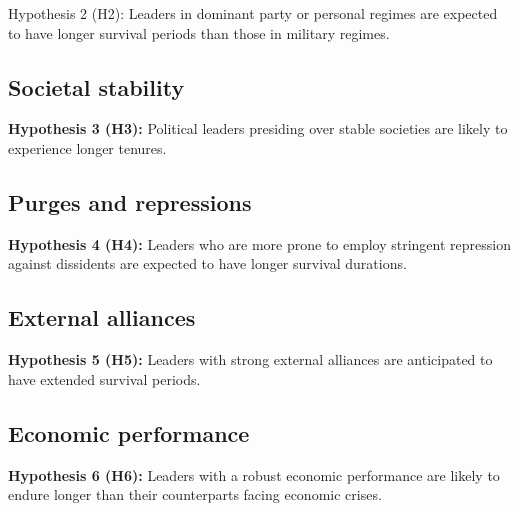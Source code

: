 \documentclass[
  a4paper,
  12pt]{article}
\begin{document}
Hypothesis 2 (H2): Leaders in dominant party or personal regimes are
expected to have longer survival periods than those in military regimes.

\subsection{Societal stability}\label{societal-stability}

\textbf{Hypothesis 3 (H3):} Political leaders presiding over stable
societies are likely to experience longer tenures.

\subsection{Purges and repressions}\label{purges-and-repressions}

\textbf{Hypothesis 4 (H4):} Leaders who are more prone to employ
stringent repression against dissidents are expected to have longer
survival durations.

\subsection{External alliances}\label{external-alliances}

\textbf{Hypothesis 5 (H5):} Leaders with strong external alliances are
anticipated to have extended survival periods.

\subsection{Economic performance}\label{economic-performance}

\textbf{Hypothesis 6 (H6):} Leaders with a robust economic performance
are likely to endure longer than their counterparts facing economic
crises.

\newpage


\renewcommand\refname{References}
  
\end{document}
